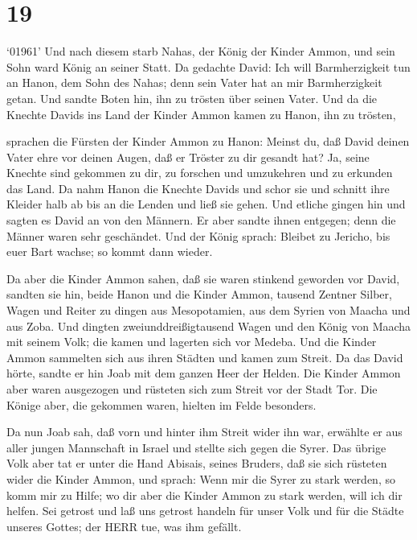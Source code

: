 \hypertarget{section-18}{%
\section{19}\label{section-18}}

 `01961' Und nach diesem starb Nahas, der König der Kinder
Ammon, und sein Sohn ward König an seiner Statt.  Da
gedachte David: Ich will Barmherzigkeit tun an Hanon, dem Sohn des
Nahas; denn sein Vater hat an mir Barmherzigkeit getan. Und sandte Boten
hin, ihn zu trösten über seinen Vater. Und da die Knechte Davids ins
Land der Kinder Ammon kamen zu Hanon, ihn zu trösten,

 sprachen die Fürsten der Kinder Ammon zu Hanon: Meinst du,
daß David deinen Vater ehre vor deinen Augen, daß er Tröster zu dir
gesandt hat? Ja, seine Knechte sind gekommen zu dir, zu forschen und
umzukehren und zu erkunden das Land.  Da nahm Hanon die
Knechte Davids und schor sie und schnitt ihre Kleider halb ab bis an die
Lenden und ließ sie gehen.  Und etliche gingen hin und
sagten es David an von den Männern. Er aber sandte ihnen entgegen; denn
die Männer waren sehr geschändet. Und der König sprach: Bleibet zu
Jericho, bis euer Bart wachse; so kommt dann wieder.

 Da aber die Kinder Ammon sahen, daß sie waren stinkend
geworden vor David, sandten sie hin, beide Hanon und die Kinder Ammon,
tausend Zentner Silber, Wagen und Reiter zu dingen aus Mesopotamien, aus
dem Syrien von Maacha und aus Zoba.  Und dingten
zweiunddreißigtausend Wagen und den König von Maacha mit seinem Volk;
die kamen und lagerten sich vor Medeba. Und die Kinder Ammon sammelten
sich aus ihren Städten und kamen zum Streit.  Da das David
hörte, sandte er hin Joab mit dem ganzen Heer der Helden. 
Die Kinder Ammon aber waren ausgezogen und rüsteten sich zum Streit vor
der Stadt Tor. Die Könige aber, die gekommen waren, hielten im Felde
besonders.

 Da nun Joab sah, daß vorn und hinter ihm Streit wider ihn
war, erwählte er aus aller jungen Mannschaft in Israel und stellte sich
gegen die Syrer.  Das übrige Volk aber tat er unter die
Hand Abisais, seines Bruders, daß sie sich rüsteten wider die Kinder
Ammon,  und sprach: Wenn mir die Syrer zu stark werden, so
komm mir zu Hilfe; wo dir aber die Kinder Ammon zu stark werden, will
ich dir helfen.  Sei getrost und laß uns getrost handeln
für unser Volk und für die Städte unseres Gottes; der HERR tue, was ihm
gefällt.

